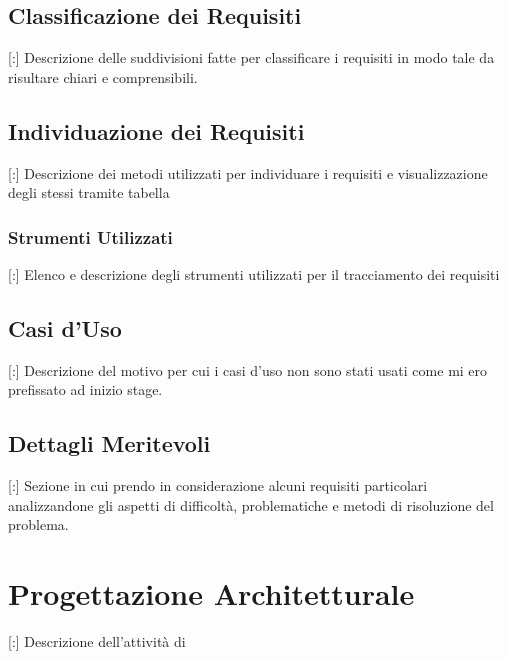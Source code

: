 \documentclass[11pt]{book}              %
\begin{document}
\subsection{Classificazione dei Requisiti}

[:] Descrizione delle suddivisioni fatte per classificare i requisiti in modo tale da risultare chiari e comprensibili.


\subsection{Individuazione dei Requisiti}

[:] Descrizione dei metodi utilizzati per individuare i requisiti e visualizzazione degli stessi tramite tabella

\subsubsection{Strumenti Utilizzati}

[:] Elenco e descrizione degli strumenti utilizzati per il tracciamento dei requisiti

\subsection{Casi d'Uso}

[:] Descrizione del motivo per cui i casi d'uso non sono stati usati come mi ero prefissato ad inizio stage.

\subsection{Dettagli Meritevoli}

[:] Sezione in cui prendo in considerazione alcuni requisiti particolari analizzandone gli aspetti di difficoltà, problematiche e metodi di risoluzione del problema.

\section{Progettazione Architetturale}

[:] Descrizione dell'attività di 
\end{document}

